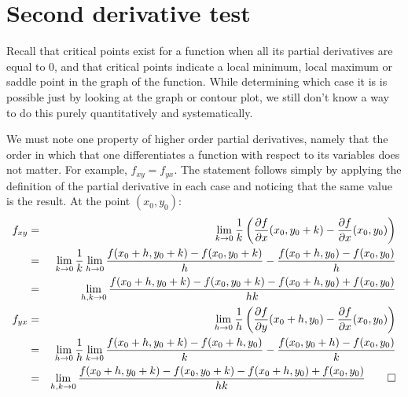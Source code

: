 \section{Second derivative test}

Recall that critical points exist for a function when all its partial derivatives are equal to 0, and that critical points indicate a local minimum, local maximum or saddle point in the graph of the function. While determining which case it is is possible just by looking at the graph or contour plot, we still don't know a way to do this purely quantitatively and systematically. 

\brm
We must note one property of higher order partial derivatives, namely that the order in which that one differentiates a function with respect to its variables does not matter. For example, $f_{xy} = f_{yx}$. The statement follows simply by applying the definition of the partial derivative in each case and noticing that the same value is the result. At the point $(x_0,y_0)$:
\begin{eqnarray*}
 f_{xy}&=&\lim_{k \to 0} \frac 1k \left(\frac{\partial f}{\partial x}(x_0,y_0+k)-\frac{\partial f}{\partial x}(x_0,y_0)\right) \\
                                &=&\lim_{k \to 0} \frac 1k \lim_{h \to 0} \frac{f(x_0+h,y_0+k)-f(x_0,y_0+k)}h - \frac{f(x_0+h,y_0)-f(x_0,y_0)}h \\
                                &=&\lim_{h,k \to 0} \frac {f(x_0+h,y_0+k)-f(x_0,y_0+k) - f(x_0+h,y_0)+f(x_0,y_0)}{hk} \\  
f_{yx} &=&\lim_{h \to 0} \frac 1h \left(\frac{\partial f}{\partial y}(x_0+h,y_0)-\frac{\partial f}{\partial x}(x_0,y_0)\right) \\
                                &=&\lim_{h \to 0} \frac 1h\lim_{k \to 0} \frac{f(x_0+h,y_0+k)-f(x_0+h,y_0)}k -  \frac{f(x_0,y_0+h)-f(x_0,y_0)}k \\
                                &=&\lim_{h,k \to 0} \frac {f(x_0+h,y_0+k)-f(x_0,y_0+k) - f(x_0+h,y_0)+f(x_0,y_0)}{hk} \qed
\end{eqnarray*} 
\erm

